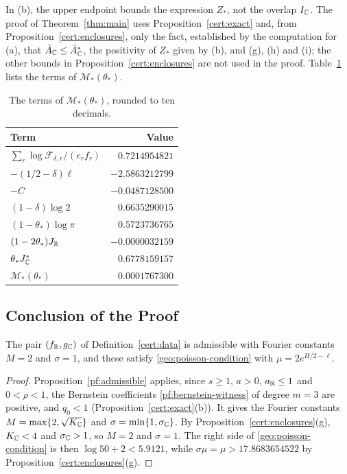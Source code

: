 In (b), the upper endpoint bounds the expression $Z_*$, not the overlap
$I_\mathbb C$. The proof of Theorem~\ref{thm:main} uses
Proposition~\ref{cert:exact} and, from
Proposition~\ref{cert:enclosures}, only the fact, established by the computation for (a), that
$\bar A_\mathbb C\le\bar A_\mathbb C^*$, the positivity of $Z_*$ given by (b), and (g), (h) and (i); the other bounds
in Proposition~\ref{cert:enclosures} are not used in the proof.
Table~\ref{cert:tab-budget} lists the terms of $\mathcal M_*(\theta_*)$.

\begin{table}[htbp]
\centering\small
\caption{The terms of $\mathcal M_*(\theta_*)$, rounded to ten decimals.}
\label{cert:tab-budget}
\begin{tabular}{lr}
\toprule
Term & Value\\
\midrule
$\sum_r\log\mathcal F_{\delta,r}/(e_rf_r)$ & $0.7214954821$\\
$-(1/2-\delta)\ell$ & $-2.5863212799$\\
$-C$ & $-0.0487128500$\\
$(1-\delta)\log2$ & $0.6635290015$\\
$(1-\theta_*)\log\pi$ & $0.5723736765$\\
$(1-2\theta_*)J_\mathbb R$ & $-0.0000032159$\\
$\theta_*J_\mathbb C^*$ & $0.6778159157$\\
\midrule
$\mathcal M_*(\theta_*)$ & $0.0001767300$\\
\bottomrule
\end{tabular}
\end{table}

\subsection{Conclusion of the Proof}

\begin{corollary}\label{cert:fourier}
The pair $(f_\mathbb R,g_\mathbb C)$ of Definition~\ref{cert:data} is admissible with
Fourier constants $M=2$ and $\sigma=1$, and these satisfy
\eqref{geo:poisson-condition} with $\mu=2e^{H/2-\ell}$.
\end{corollary}

\begin{proof}
Proposition~\ref{pf:admissible} applies, since $s\ge1$, $a>0$,
$a_\mathbb R\le1$ and $0<\rho<1$, the Bernstein coefficients
\eqref{pf:bernstein-witness} of degree $m=3$ are positive, and $q_0<1$
(Proposition~\ref{cert:exact}(b)). It gives the Fourier constants
$M=\max\{2,\sqrt{K_\mathbb C}\}$ and $\sigma=\min\{1,\sigma_\mathbb C\}$. By
Proposition~\ref{cert:enclosures}(g), $K_\mathbb C<4$ and $\sigma_\mathbb C>1$, so
$M=2$ and $\sigma=1$. The right side of \eqref{geo:poisson-condition} is
then $\log50+2<5.9121$, while $\sigma\mu=\mu>17.8683654522$ by
Proposition~\ref{cert:enclosures}(g).
\end{proof}

